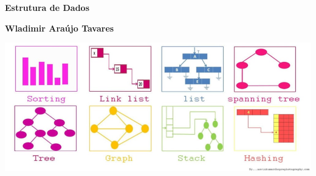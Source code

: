
\thispagestyle{empty}

\vspace{3cm}
  \begin{center}
	\bfseries  \Huge Estrutura de Dados \par   %
        \bfseries \Large Wladimir Araújo Tavares \par   %
        \vspace{3cm}
      	{\centering \includegraphics[width=1.0\linewidth,scale=1.5]{images/cover.jpg}}
    \end{center}
    
\par

\newpage

